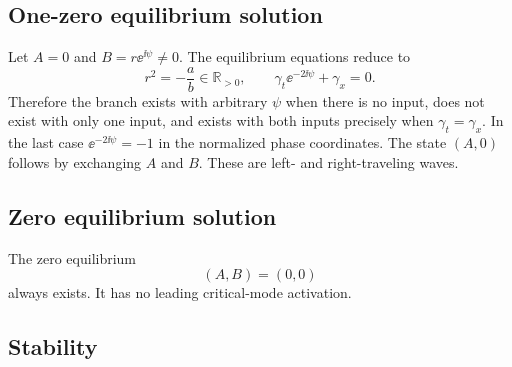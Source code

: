 \subsection{One-zero equilibrium solution}

Let $A=0$ and $B=r\ee^{\ii\psi}\neq0$.  The equilibrium equations reduce
to
\begin{equation}
 r^2=-\frac ab\in\mathbb R_{>0},
 \qquad
 \gamma_t\ee^{-2\ii\psi}+\gamma_x=0.
 \label{eq:one-zero-solution}
\end{equation}
Therefore the branch exists with arbitrary $\psi$ when there is no input,
does not exist with only one input, and exists with both inputs precisely
when $\gamma_t=\gamma_x$.  In the last case
$\ee^{-2\ii\psi}=-1$ in the normalized phase coordinates.  The state
$(A,0)$ follows by exchanging $A$ and $B$.  These are left- and
right-traveling waves.

\subsection{Zero equilibrium solution}

The zero equilibrium
\begin{equation}
 (A,B)=(0,0)
 \label{eq:zero-equilibrium}
\end{equation}
always exists.  It has no leading critical-mode activation.

\subsection{Stability}

